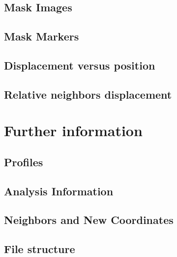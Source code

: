 \documentclass{article}
\begin{document}
  \newpage
  \subsection{Mask Images}
  \label{sub:Mask Images}
    \vspace{.2cm}
    

  \newpage
  \subsection{Mask Markers}
  \label{sub:Mask Markers}
    \vspace{.2cm}
    

  \newpage
  \subsection{Displacement versus position}
  \label{sub:Displacement versus position}
    \vspace{.2cm}
    

  \newpage
  \subsection{Relative neighbors displacement}
  \label{subs:Relative neighbors displacement}
    \vspace{.2cm}
    

\newpage
\section{Further information}
\label{sec:Further information}
\vspace{.5cm}

  \subsection{Profiles}
  \label{sub:Profiles}
    \vspace{.2cm}
    

  \newpage
  \subsection{Analysis Information}
  \label{sub:Analysis Information}
    \vspace{.2cm}
    
  \subsection{Neighbors and New Coordinates}
  \label{sub: Neighbors and New Coordinates}
    \vspace{.2cm}
    
  \subsection{File structure}
  \label{sub:File structure}
    \vspace{.2cm}
    
\end{document}
